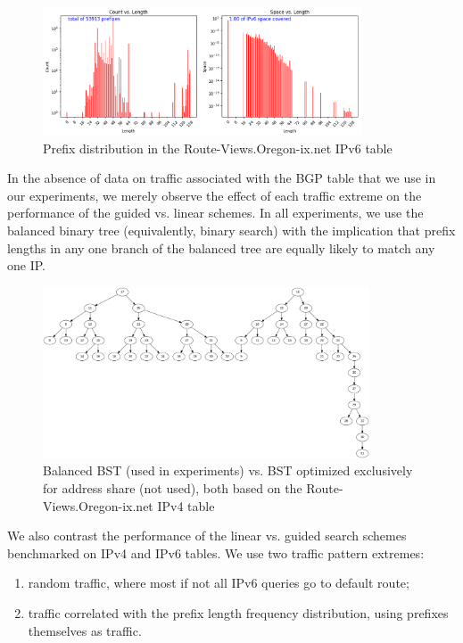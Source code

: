 \documentclass[conference,compsoc]{IEEEtran}
\begin{document}
\begin{figure}[h]
\centering
\includegraphics[height=1.5in]{../img/prefix_distribution_v6.png}
  \caption{Prefix distribution in the Route-Views.Oregon-ix.net IPv6 table}
\label{fig:prefixes-v6}
\end{figure}

In the absence of data on traffic associated with the BGP table that we
use in our experiments, we merely observe the effect of each traffic
extreme on the performance of the guided vs. linear schemes. In all
experiments, we use the balanced binary tree (equivalently, binary search)
with the implication that prefix lengths in any one branch of the
balanced tree are equally likely to match any one IP.

\begin{figure}[h]
\centering
\includegraphics[height=2.0in]{../img/trees_v4.png}
  \caption{Balanced BST (used in experiments) vs. BST optimized exclusively for address share (not used), both based on the Route-Views.Oregon-ix.net IPv4 table}
\label{fig:trees-v4}
\end{figure}

We also contrast the performance of the linear vs. guided search schemes
benchmarked on IPv4 and IPv6 tables. We use two traffic pattern extremes:

\begin{enumerate}
\item random traffic, where most if not all IPv6 queries go to default route;
\item traffic correlated with the prefix length frequency distribution,
  using prefixes themselves as traffic.
\end{enumerate}
\end{document}
